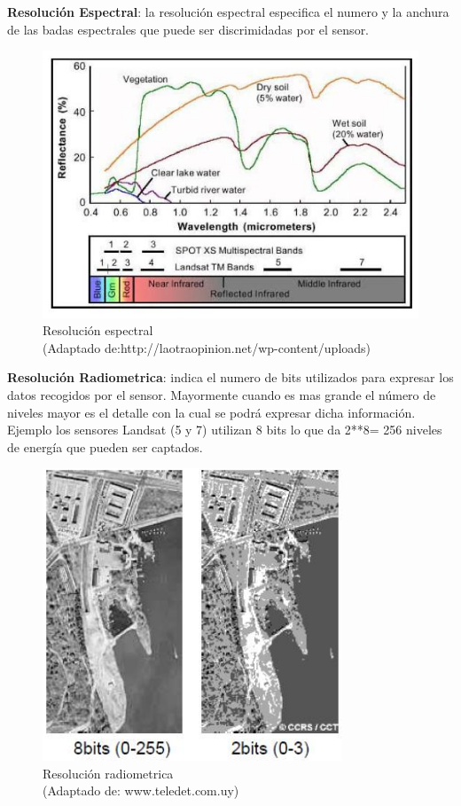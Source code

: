 \par \textbf{Resolución Espectral}: la resolución espectral especifica el numero y la anchura de las badas espectrales que puede ser discrimidadas por el sensor.

\begin{figure}[H] \centering
  \includegraphics[scale=0.5,keepaspectratio=true,clip=true]{imagenes/MarcoTeorico/resolucion_espectral.jpg}
  \caption{Resolución espectral \\ (Adaptado de:http://laotraopinion.net/wp-content/uploads)}\label{Fig:resolucion-espectral}
\end{figure}

\par \textbf{Resolución Radiometrica}: indica el numero de bits utilizados para expresar los datos recogidos por el sensor. Mayormente cuando es mas grande el número de niveles mayor es el detalle con la cual se podrá expresar dicha información. Ejemplo los sensores Landsat (5 y 7) utilizan 8 bits lo que da 2**8= 256 niveles de energía que pueden ser captados.
\begin{figure}[H] \centering
  \includegraphics[scale=0.5,keepaspectratio=true,clip=true]{imagenes/MarcoTeorico/resolucion_radiometrica.png}
  \caption{Resolución radiometrica \\ (Adaptado de: www.teledet.com.uy)}\label{Fig:resolucion-radiometrica}
\end{figure}

